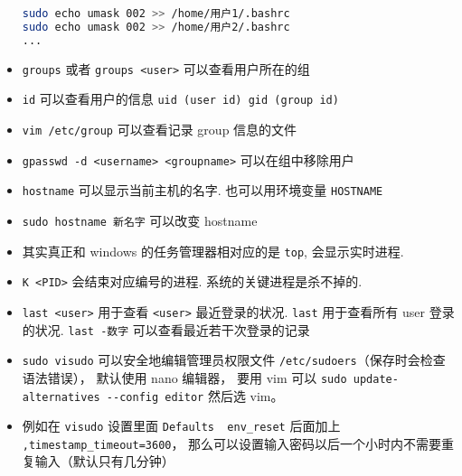 \begin{itemize}
\begin{lstlisting}[language=bash]
sudo echo umask 002 >> /home/用户1/.bashrc
sudo echo umask 002 >> /home/用户2/.bashrc
...
\end{lstlisting}
\item \verb`groups` 或者 \verb`groups <user>` 可以查看用户所在的组
\item \verb`id` 可以查看用户的信息 \verb`uid (user id) gid (group id)`
\item \verb`vim /etc/group` 可以查看记录 group 信息的文件
\item \verb`gpasswd -d <username> <groupname>` 可以在组中移除用户
\item \verb`hostname` 可以显示当前主机的名字. 也可以用环境变量 \verb`HOSTNAME`
\item \verb`sudo hostname 新名字` 可以改变 hostname
\item 其实真正和 windows 的任务管理器相对应的是 \verb`top`, 会显示实时进程. 
\item \verb`K <PID>` 会结束对应编号的进程. 系统的关键进程是杀不掉的.
\item \verb`last <user>` 用于查看 \verb`<user>` 最近登录的状况. \verb`last` 用于查看所有 user 登录的状况. \verb`last -数字` 可以查看最近若干次登录的记录
\item \verb`sudo visudo` 可以安全地编辑管理员权限文件 \verb`/etc/sudoers`（保存时会检查语法错误）， 默认使用 nano 编辑器， 要用 vim
 可以 \verb`sudo update-alternatives --config editor` 然后选 vim。
\item 例如在 \verb`visudo` 设置里面 \verb`Defaults  env_reset` 后面加上 \verb`,timestamp_timeout=3600`， 那么可以设置输入密码以后一个小时内不需要重复输入（默认只有几分钟）
\end{itemize}

